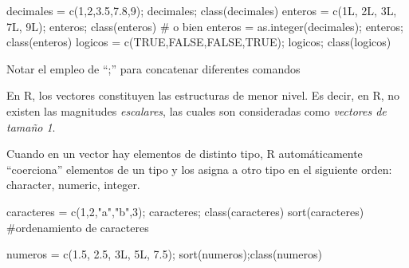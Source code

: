 \documentclass[
  spanish,
  letterpaper,
  DIV=11,
  numbers=noendperiod]{scrreprt}
\newenvironment{Shaded}{\begin{snugshade}}{\end{snugshade}}
\newcommand{\CommentTok}[1]{\textcolor[rgb]{0.37,0.37,0.37}{#1}}
\newcommand{\ConstantTok}[1]{\textcolor[rgb]{0.56,0.35,0.01}{#1}}
\newcommand{\DecValTok}[1]{\textcolor[rgb]{0.68,0.00,0.00}{#1}}
\newcommand{\FloatTok}[1]{\textcolor[rgb]{0.68,0.00,0.00}{#1}}
\newcommand{\FunctionTok}[1]{\textcolor[rgb]{0.28,0.35,0.67}{#1}}
\newcommand{\NormalTok}[1]{\textcolor[rgb]{0.00,0.23,0.31}{#1}}
\newcommand{\OtherTok}[1]{\textcolor[rgb]{0.00,0.23,0.31}{#1}}
\newcommand{\StringTok}[1]{\textcolor[rgb]{0.13,0.47,0.30}{#1}}
\begin{document}
\begin{Shaded}
\begin{Highlighting}[]
\NormalTok{decimales }\OtherTok{=} \FunctionTok{c}\NormalTok{(}\DecValTok{1}\NormalTok{,}\DecValTok{2}\NormalTok{,}\FloatTok{3.5}\NormalTok{,}\FloatTok{7.8}\NormalTok{,}\DecValTok{9}\NormalTok{); decimales; }\FunctionTok{class}\NormalTok{(decimales)}
\NormalTok{enteros }\OtherTok{=} \FunctionTok{c}\NormalTok{(}\DecValTok{1}\NormalTok{L, }\DecValTok{2}\NormalTok{L, }\DecValTok{3}\NormalTok{L, }\DecValTok{7}\NormalTok{L, }\DecValTok{9}\NormalTok{L); enteros; }\FunctionTok{class}\NormalTok{(enteros)}
\CommentTok{\# o bien}
\NormalTok{enteros }\OtherTok{=} \FunctionTok{as.integer}\NormalTok{(decimales); enteros; }\FunctionTok{class}\NormalTok{(enteros)}
\NormalTok{logicos }\OtherTok{=} \FunctionTok{c}\NormalTok{(}\ConstantTok{TRUE}\NormalTok{,}\ConstantTok{FALSE}\NormalTok{,}\ConstantTok{FALSE}\NormalTok{,}\ConstantTok{TRUE}\NormalTok{); logicos; }\FunctionTok{class}\NormalTok{(logicos)}
\end{Highlighting}
\end{Shaded}

\begin{tcolorbox}[enhanced jigsaw, arc=.35mm, bottomrule=.15mm, bottomtitle=1mm, breakable, colback=white, colbacktitle=quarto-callout-note-color!10!white, colframe=quarto-callout-note-color-frame, coltitle=black, left=2mm, leftrule=.75mm, opacityback=0, opacitybacktitle=0.6, rightrule=.15mm, title=\textcolor{quarto-callout-note-color}{\faInfo}\hspace{0.5em}{Nota}, titlerule=0mm, toprule=.15mm, toptitle=1mm]

Notar el empleo de ``;'' para concatenar diferentes comandos

\end{tcolorbox}

En R, los vectores constituyen las estructuras de menor nivel. Es decir,
en R, no existen las magnitudes \emph{escalares}, las cuales son
consideradas como \emph{vectores de tamaño 1}.

Cuando en un vector hay elementos de distinto tipo, R automáticamente
``coerciona'' elementos de un tipo y los asigna a otro tipo en el
siguiente orden: character, numeric, integer.

\begin{Shaded}
\begin{Highlighting}[]

\NormalTok{caracteres }\OtherTok{=} \FunctionTok{c}\NormalTok{(}\DecValTok{1}\NormalTok{,}\DecValTok{2}\NormalTok{,}\StringTok{"a"}\NormalTok{,}\StringTok{"b"}\NormalTok{,}\DecValTok{3}\NormalTok{); caracteres; }\FunctionTok{class}\NormalTok{(caracteres)}
\FunctionTok{sort}\NormalTok{(caracteres) }\CommentTok{\#ordenamiento de caracteres}

\NormalTok{numeros }\OtherTok{=} \FunctionTok{c}\NormalTok{(}\FloatTok{1.5}\NormalTok{, }\FloatTok{2.5}\NormalTok{, }\DecValTok{3}\NormalTok{L, }\DecValTok{5}\NormalTok{L, }\FloatTok{7.5}\NormalTok{); }\FunctionTok{sort}\NormalTok{(numeros);}\FunctionTok{class}\NormalTok{(numeros)}
\end{Highlighting}
\end{Shaded}
\end{document}
